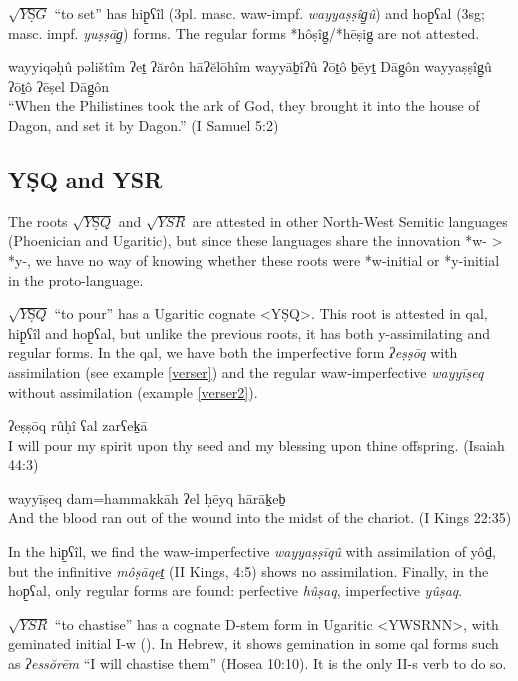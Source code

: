 \documentclass[oldfontcommands,oneside,a4paper,11pt]{article}
\newcommand{\racine}[1]{\begin{math}\sqrt{#1}\end{math}}
\newcommand{\forme}[1]{\textit{#1}}
\begin{document}
\begin{sloppypar}
   \racine{YṢG}  ``to set'' has hip̠ʕîl (3pl. masc. waw-impf. \forme{wayyaṣṣîg̠û}) and hop̠ʕal (3sg; masc. impf. \forme{yuṣṣāg̠}) forms. The regular forms *hôṣîg̠/*hēṣig̠ are not attested.
\begin{exe}
\ex \label{placer}
	 wayyiqəḥû pəlištîm ʔet̠ ʔărôn hāʔĕlōhîm wayyāb̠îʔû ʔōt̠ô b̠ēyt̠ Dāg̠ôn wayyaṣṣîg̠û ʔōt̠ô ʔēṣel Dāg̠ôn  \\
``When the Philistines took the ark of God, they brought it into the house of Dagon, and set it by Dagon.'' (I Samuel 5:2)
\end{exe}
 

\subsection{YṢQ and YSR } \label{ysq}
The roots  \racine{YṢQ} and \racine{YSR} are attested in other North-West Semitic languages (Phoenician and Ugaritic), but since these languages share the innovation *w- > *y-, we have no way of knowing whether these roots were *w-initial or *y-initial in the proto-language.
 

  \racine{YṢQ}  ``to pour” has a  Ugaritic cognate <YṢQ>. This root is attested in qal, hip̠ʕîl and hop̠ʕal, but unlike the previous roots, it has both y-assimilating and regular forms. In the qal, we have both  the imperfective form \forme{ʔeṣṣōq} with assimilation (see example \ref{verser}) and the regular waw-imperfective \forme{wayyīṣeq} without assimilation (example \ref{verser2}). 

\begin{exe}
\ex \label{verser}
	 ʔeṣṣōq rûḥî ʕal zarʕek̠ā   \\
I will pour my spirit upon thy seed and my blessing upon thine offspring.  (Isaiah 44:3)
\end{exe}

\begin{exe}
\ex \label{verser2}
	 wayyīṣeq dam=hammakkāh ʔel ḥēyq hārāk̠eb̠ \\
And the blood  ran out  of the wound  into  the midst  of the chariot. (I Kings 22:35)
\end{exe}
In the hip̠ʕîl, we find the waw-imperfective \forme{wayyaṣṣīqû} with assimilation of yôd̠, but the infinitive \forme{môṣāqet̠} (II Kings, 4:5) shows no assimilation. Finally, in the hop̠ʕal, only regular forms are found: perfective \forme{hûṣaq}, imperfective \forme{yûṣaq}.


  \racine{YSR} ``to chastise'' has a cognate  D-stem form in Ugaritic <YWSRNN>, with geminated initial I-w (\citealt[459, n. 9]{huehnergard06}). In Hebrew, it shows gemination in some qal forms such as \forme{ʔessŏrēm} “I will chastise them” (Hosea 10:10). It is the only II-s verb to do so.


\end{sloppypar}
\end{document}
